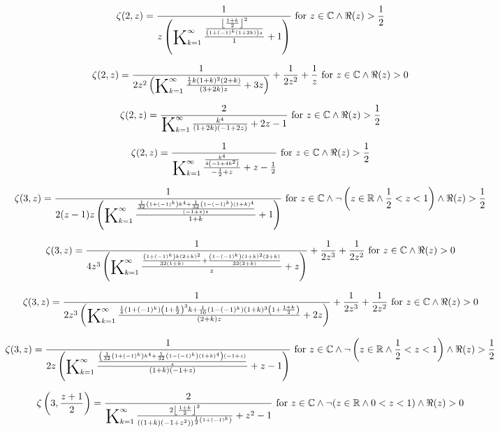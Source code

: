 \documentclass{article}
\newcommand{\bigK}{\mathop{\raisebox{-5pt}{\huge K}}}
\begin{document}
\[\zeta (2,z)=\frac{1}{z \left(\bigK_{k=1}^{\infty}\frac{\frac{\left\lfloor \frac{1+k}{2}\right\rfloor ^2}{\left(1+(-1)^k (1+2 k)\right) z}}{1}+1\right)}\text{ for }z\in \mathbb{C}\land \Re(z)>\frac{1}{2}\] 

\[\zeta (2,z)=\frac{1}{2 z^2 \left(\bigK_{k=1}^{\infty}\frac{\frac{1}{4} k (1+k)^2 (2+k)}{(3+2 k) z}+3 z\right)}+\frac{1}{2 z^2}+\frac{1}{z}\text{ for }z\in \mathbb{C}\land \Re(z)>0\] 

\[\zeta (2,z)=\frac{2}{\bigK_{k=1}^{\infty}\frac{k^4}{(1+2 k) (-1+2 z)}+2 z-1}\text{ for }z\in \mathbb{C}\land \Re(z)>\frac{1}{2}\] 

\[\zeta (2,z)=\frac{1}{\bigK_{k=1}^{\infty}\frac{\frac{k^4}{4 \left(-1+4 k^2\right)}}{-\frac{1}{2}+z}+z-\frac{1}{2}}\text{ for }z\in \mathbb{C}\land \Re(z)>\frac{1}{2}\] 

\[\zeta (3,z)=\frac{1}{2 (z-1) z \left(\bigK_{k=1}^{\infty}\frac{\frac{\frac{1}{32} \left(1+(-1)^k\right) k^4+\frac{1}{32} \left(1-(-1)^k\right) (1+k)^4}{(-1+z) z}}{1+k}+1\right)}\text{ for }z\in \mathbb{C}\land \neg \left(z\in \mathbb{R}\land \frac{1}{2}<z<1\right)\land \Re(z)>\frac{1}{2}\] 

\[\zeta (3,z)=\frac{1}{4 z^3 \left(\bigK_{k=1}^{\infty}\frac{\frac{\left(1+(-1)^k\right) k (2+k)^2}{32 (1+k)}+\frac{\left(1-(-1)^k\right) (1+k)^2 (3+k)}{32 (2+k)}}{z}+z\right)}+\frac{1}{2 z^3}+\frac{1}{2 z^2}\text{ for }z\in \mathbb{C}\land \Re(z)>0\] 

\[\zeta (3,z)=\frac{1}{2 z^3 \left(\bigK_{k=1}^{\infty}\frac{\frac{1}{4} \left(1+(-1)^k\right) \left(1+\frac{k}{2}\right)^3 k+\frac{1}{16} \left(1-(-1)^k\right) (1+k)^3 \left(1+\frac{1+k}{2}\right)}{(2+k) z}+2 z\right)}+\frac{1}{2 z^3}+\frac{1}{2 z^2}\text{ for }z\in \mathbb{C}\land \Re(z)>0\] 

\[\zeta (3,z)=\frac{1}{2 z \left(\bigK_{k=1}^{\infty}\frac{\frac{\left(\frac{1}{32} \left(1+(-1)^k\right) k^4+\frac{1}{32} \left(1-(-1)^k\right) (1+k)^4\right) (-1+z)}{z}}{(1+k) (-1+z)}+z-1\right)}\text{ for }z\in \mathbb{C}\land \neg \left(z\in \mathbb{R}\land \frac{1}{2}<z<1\right)\land \Re(z)>\frac{1}{2}\] 

\[\zeta \left(3,\frac{z+1}{2}\right)=\frac{2}{\bigK_{k=1}^{\infty}\frac{2 \left\lfloor \frac{1+k}{2}\right\rfloor ^3}{\left((1+k) \left(-1+z^2\right)\right)^{\frac{1}{2} \left(1+(-1)^k\right)}}+z^2-1}\text{ for }z\in \mathbb{C}\land \neg (z\in \mathbb{R}\land 0<z<1)\land \Re(z)>0\] 
\end{document}
